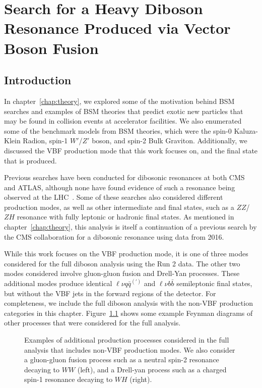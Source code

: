 
\chapter{Search for a Heavy Diboson Resonance Produced via Vector Boson Fusion}
\label{chap:analysis}

\section{Introduction}

In chapter~\ref{chap:theory}, we explored some of the motivation behind BSM searches and examples of BSM theories that predict exotic new particles that may be found in collision events at accelerator facilities.
We also enumerated some of the benchmark models from BSM theories, which were the spin-0 Kaluza-Klein Radion, spin-1 $W'$/$Z'$ boson, and spin-2 Bulk Graviton.
Additionally, we discussed the VBF production mode that this work focuses on, and the final state that is produced.

Previous searches have been conducted for dibosonic resonances at both CMS and ATLAS, although none have found evidence of such a resonance being observed at the LHC~\cite{Sirunyan_18,Aaboud_18,Aaboud_18_2,Aad_15,Khachatryan_14,Sirunyan_17,Sirunyan_17_2,atlas20}.
Some of these searches also considered different production modes, as well as other intermediate and final states, such as a $ZZ$/$ZH$ resonance with fully leptonic or hadronic final states.
As mentioned in chapter~\ref{chap:theory}, this analysis is itself a continuation of a previous search by the CMS collaboration for a dibosonic resonance using data from 2016.

While this work focuses on the VBF production mode, it is one of three modes considered for the full diboson analysis using the Run 2 data.
The other two modes considered involve gluon-gluon fusion and Drell-Yan processes.
These additional modes produce identical $\ell\nu q\bar{q}^{(\prime)}$ and $\ell\nu b\bar{b}$ semileptonic final states, but without the VBF jets in the forward regions of the detector.
For completeness, we include the full diboson analysis with the non-VBF production categories in this chapter.
Figure~\ref{fig:nonVbf} shows some example Feynman diagrams of other processes that were considered for the full analysis.

\begin{figure}[htbp]
  \centering
  
  \caption{
    Examples of additional production processes considered in the full analysis that includes non-VBF production modes.
    We also consider a gluon-gluon fusion process such as a neutral spin-2 resonance decaying to $WW$ (left), and a Drell-yan process such as a charged spin-1 resonance decaying to $WH$ (right).
  }
  \label{fig:nonVbf}
\end{figure}


